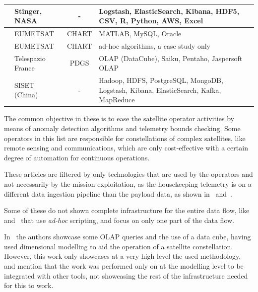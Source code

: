 \begin{table}[htbp]
\begin{center}
\begin{tabular}{|C{13em}|C{6em}|c|C{10em}|}
      \hline
      \cite{mateikUsingBigData2017}                  & Stinger, NASA      & -                    & Logstash, ElasticSearch, Kibana, HDF5, CSV, R, Python, AWS, Excel                    \\
      \hline
      \cite{schulsterCHARTingFutureOffline2018}      & EUMETSAT           & CHART                & MATLAB, MySQL, Oracle                                                                \\
      \hline
      \cite{trollopeAnalysisAutomatedTechniques2018} & EUMETSAT           & CHART                & ad-hoc algorithms, a case study only \\
      \hline
      \cite{yvernesCopernicusGroundSegment2018}      & Telespazio France  & PDGS                 & OLAP (DataCube), Saiku, Pentaho, Jaspersoft OLAP                                     \\
      \hline
      \cite{zhangBigDataFramework2017}               & SISET (China)      & -                    & Hadoop, HDFS, PostgreSQL, MongoDB, Logstash, Kibana, ElasticSearch, Kafka, MapReduce \\
      \hline
    \end{tabular}
  \end{center}
\end{table}

The common objective in these is to ease the satellite operator activities by means of anomaly detection algorithms and telemetry bounds checking.
Some operators in this list are responsible for constellations of complex satellites, like remote sensing and communications, which are only cost-effective with a certain degree of automation for continuous operations.

These articles are filtered by only technologies that are used by the operators and not necessarily by the mission exploitation, as the housekeeping telemetry is on a different data ingestion pipeline than the payload data, as shown in~\cite{mateikUsingBigData2017} and~\cite{adamskiDataAnalyticsLarge2016}.

Some of these do not shown complete infrastructure for the entire data flow, like~\cite{fernandezTelemetryAnomalyDetection2017} and~\cite{trollopeAnalysisAutomatedTechniques2018} that use \textit{ad-hoc} scripting, and focus on only one part of the data flow.

In~\cite{yvernesCopernicusGroundSegment2018} the authors showcase some OLAP queries and the use of a data cube, having used dimensional modelling to aid the operation of a satellite constellation. However, this work only showcases at a very high level the used methodology, and mention that the work was performed only on at the modelling level to be integrated with other tools, not showcasing the rest of the infrastructure needed for this to work.

